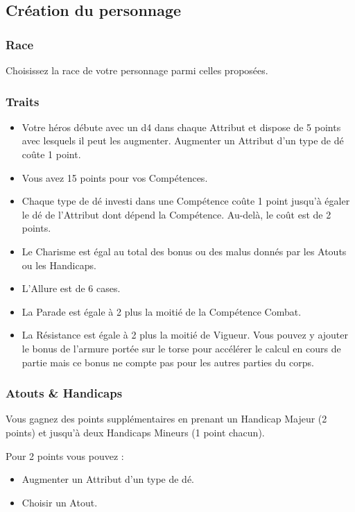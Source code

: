 \subsection{Création du personnage}

\subsubsection{Race}
Choisissez la race de votre personnage parmi celles proposées.

\subsubsection{Traits}
\begin{itemize}
	\item Votre héros débute avec un d4 dans chaque Attribut et dispose de 5 points avec lesquels il peut les augmenter. Augmenter un Attribut d’un type de 	dé coûte 1 point.
	\item Vous avez 15 points pour vos Compétences.
	\item Chaque type de dé investi dans une Compétence coûte 1 point jusqu’à égaler le dé de l’Attribut dont dépend la Compétence. Au-delà, le coût est de 	2 points.
	\item Le Charisme est égal au total des bonus ou des malus donnés par les Atouts ou les Handicaps.
	\item L’Allure est de 6 cases.
	\item La Parade est égale à 2 plus la moitié de la Compétence Combat.
	\item La Résistance est égale à 2 plus la moitié de Vigueur. Vous pouvez y ajouter le bonus de l’armure portée sur le torse pour accélérer le calcul en 	cours de partie mais ce bonus ne compte pas pour les autres parties du corps.
\end{itemize}

\subsubsection{Atouts \& Handicaps}
Vous gagnez des points supplémentaires en prenant un Handicap Majeur (2 points) et jusqu’à deux Handicaps Mineurs (1 point chacun).

Pour 2 points vous pouvez :
\begin{itemize}
	\item Augmenter un Attribut d’un type de dé.
	\item Choisir un Atout.
\end{itemize}


